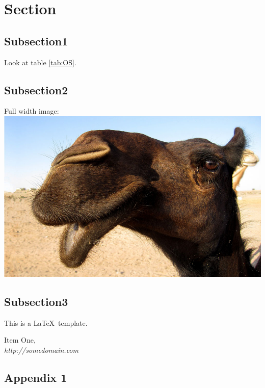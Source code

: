\documentclass[12pt]{article} %
\begin{document}
\section{Section}
\subsection{Subsection1}
Look at table \ref{tab:OS}.


\subsection{Subsection2}
Full width image:\\
\includegraphics[width=\textwidth]{camel}

\subsection{Subsection3}
This is a \LaTeX~template\cite{bibitem1}.


\begin{thebibliography}{99}
  Item One,\\
  \emph{http://somedomain.com}
\end{thebibliography}





\begin{appendices}
	\section{Appendix 1}
	
\end{appendices}
\end{document}
